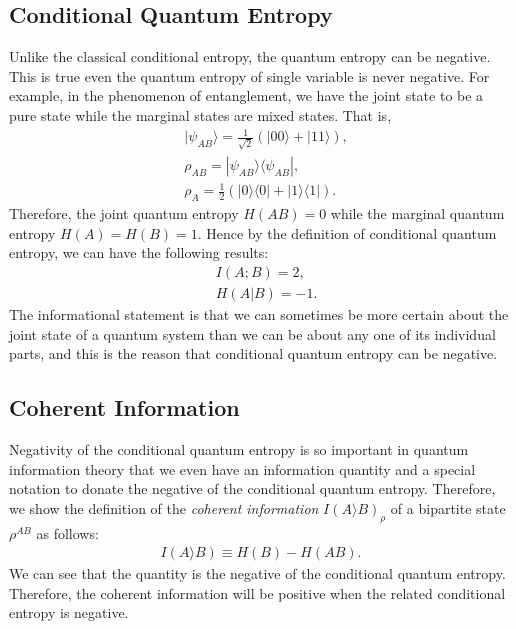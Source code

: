 \subsection{Conditional Quantum Entropy}
Unlike the classical conditional entropy, the quantum entropy can be negative.
This is true even the quantum entropy of single variable is never negative.
For example, in the phenomenon of entanglement, we have the joint state to be a pure state while the marginal states are mixed states.
That is,
\begin{align}
& |\psi_{AB} \rangle = \frac{1}{\sqrt{2}}(|00\rangle + |11\rangle), \nonumber \\
& \rho_{AB}= |\psi_{AB} \rangle \langle \psi_{AB}|, \nonumber \\
& \rho_A=\frac{1}{2}(|0\rangle \langle 0| + |1\rangle \langle 1|).
\end{align}
Therefore, the joint quantum entropy $H(AB) = 0$ while the marginal quantum entropy $H(A) = H(B) = 1$.
Hence by the definition of conditional quantum entropy, we can have the following results:
\begin{align}
&I(A;B)=2, \nonumber \\
&H(A|B)=-1. 
\end{align}
The informational statement is that we can sometimes be more certain about the joint state of a quantum system than we can be about any one of its individual parts, and this is the reason that conditional  quantum entropy can be negative.

\subsection{Coherent Information}
Negativity of the conditional quantum entropy is so important in quantum information theory that we even have an information quantity and a special notation to donate the negative of the conditional quantum entropy.
Therefore, we show the definition of the \textit{coherent information} $I(A\rangle B)_{\rho}$ of a bipartite state $\rho^{AB}$ as follows:
\begin{align}
I(A\rangle B) \equiv H(B)-H(AB).
\end{align}
We can see that the quantity is the negative of the conditional quantum entropy.
Therefore, the coherent information will be positive when the related conditional entropy is negative.
